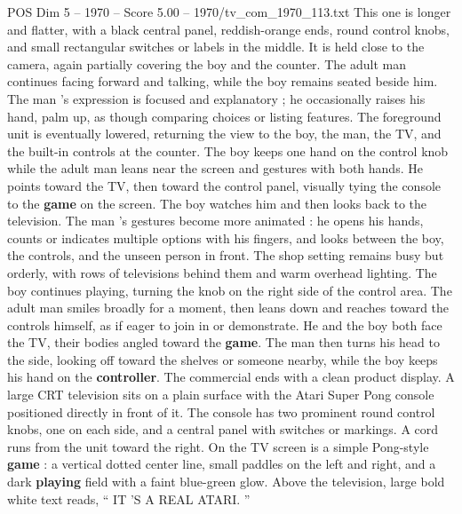 \begin{textsample}{POS Dim 5 – 1970 – Score 5.00 – 1970/tv\_com\_1970\_113.txt}
This one is longer and flatter, with a black central panel, reddish-orange ends, round control knobs, and small rectangular switches or labels in the middle.
It is held close to the camera, again partially covering the boy and the counter.
The adult man continues facing forward and talking, while the boy remains seated beside him.
The man ’s expression is focused and explanatory ; he occasionally raises his hand, palm up, as though comparing choices or listing features.
The foreground unit is eventually lowered, returning the view to the boy, the man, the TV, and the built-in controls at the counter.
The boy keeps one hand on the control knob while the adult man leans near the screen and gestures with both hands.
He points toward the TV, then toward the control panel, visually tying the console to the \textbf{game} on the screen.
The boy watches him and then looks back to the television.
The man ’s gestures become more animated : he opens his hands, counts or indicates multiple options with his fingers, and looks between the boy, the controls, and the unseen person in front.
The shop setting remains busy but orderly, with rows of televisions behind them and warm overhead lighting.
The boy continues playing, turning the knob on the right side of the control area.
The adult man smiles broadly for a moment, then leans down and reaches toward the controls himself, as if eager to join in or demonstrate.
He and the boy both face the TV, their bodies angled toward the \textbf{game}.
The man then turns his head to the side, looking off toward the shelves or someone nearby, while the boy keeps his hand on the \textbf{controller}.
The commercial ends with a clean product display.
A large CRT television sits on a plain surface with the Atari Super Pong console positioned directly in front of it.
The console has two prominent round control knobs, one on each side, and a central panel with switches or markings.
A cord runs from the unit toward the right.
On the TV screen is a simple Pong-style \textbf{game} : a vertical dotted center line, small paddles on the left and right, and a dark \textbf{playing} field with a faint blue-green glow.
Above the television, large bold white text reads, “ IT ’S A REAL ATARI. ”

\end{textsample}
